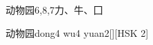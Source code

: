 \begin{entry}{动物园}{6,8,7}{⼒、⽜、⼞}
  \begin{phonetics}{动物园}{dong4 wu4 yuan2}[][HSK 2]
  \end{phonetics}
\end{entry}
